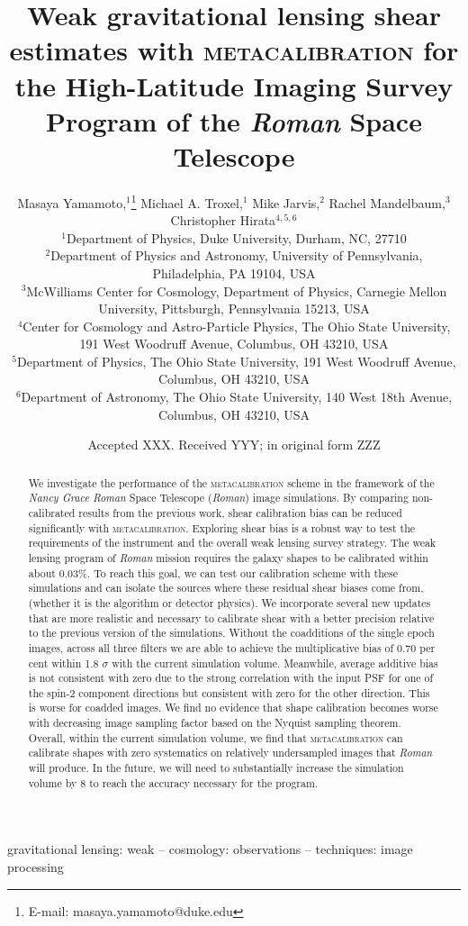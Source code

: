 \documentclass[fleqn,usenatbib]{mnras}
\title[Metacalibration with Roman High-Latitude Imaging Survey]{Weak gravitational lensing shear estimates with \textsc{metacalibration} for the High-Latitude Imaging Survey Program of the \emph{Roman} Space Telescope}
\author[M. Yamamoto et al.]{
Masaya Yamamoto,$^{1}$\thanks{E-mail: masaya.yamamoto@duke.edu}
Michael A. Troxel,$^{1}$
Mike Jarvis,$^{2}$
Rachel Mandelbaum,$^{3}$
Christopher Hirata$^{4,5,6}$
\\
$^{1}$Department of Physics, Duke University, Durham, NC, 27710\\
$^{2}$Department of Physics and Astronomy, University of Pennsylvania, Philadelphia, PA 19104, USA\\
$^{3}$McWilliams Center for Cosmology, Department of Physics, Carnegie Mellon University, Pittsburgh, Pennsylvania 15213, USA\\
$^{4}$Center for Cosmology and Astro-Particle Physics, The Ohio State University, 191 West Woodruff Avenue, Columbus, OH 43210, USA\\
$^{5}$Department of Physics, The Ohio State University, 191 West Woodruff Avenue, Columbus, OH 43210, USA\\
$^{6}$Department of Astronomy, The Ohio State University, 140 West 18th Avenue, Columbus, OH 43210, USA\\
}
\date{Accepted XXX. Received YYY; in original form ZZZ}
\begin{document}
\label{firstpage}
\pagerange{\pageref{firstpage}--\pageref{lastpage}}
\maketitle

\begin{abstract}
We investigate the performance of the \textsc{metacalibration} scheme in the framework of the \emph{Nancy Grace Roman} Space Telescope (\emph{Roman}) image simulations. By comparing non-calibrated results from the previous work, shear calibration bias can be reduced significantly with \textsc{metacalibration}. Exploring shear bias is a robust way to test the requirements of the instrument and the overall weak lensing survey strategy. The weak lensing program of \emph{Roman} mission requires the galaxy shapes to be calibrated within about 0.03\%. To reach this goal, we can test our calibration scheme with these simulations and can isolate the sources where these residual shear biases come from, (whether it is the algorithm or detector physics). We incorporate several new updates that are more realistic and necessary to calibrate shear with a better precision relative to the previous version of the simulations. Without the coadditions of the single epoch images, across all three filters we are able to achieve the multiplicative bias of 0.70 per cent within 1.8 $\sigma$ with the current simulation volume. Meanwhile, average additive bias is not consistent with zero due to the strong correlation with the input PSF for one of the spin-2 component directions but consistent with zero for the other direction. This is worse for coadded images. We find no evidence that shape calibration becomes worse with decreasing image sampling factor based on the Nyquist sampling theorem. Overall, within the current simulation volume, we find that \textsc{metacalibration} can calibrate shapes with zero systematics on relatively undersampled images that \emph{Roman} will produce. In the future, we will need to substantially increase the simulation volume by 8 to reach the accuracy necessary for the program. 
\end{abstract}

\begin{keywords}
gravitational lensing: weak -- cosmology: observations -- techniques: image processing
\end{keywords}
\end{document}
